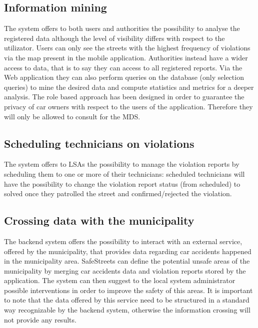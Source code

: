 \subsection{Information mining}
The system offers to both users and authorities the possibility to analyse the registered data although the level of visibility differs with respect to the utilizator. 
Users can only see the streets with the highest frequency of violations via the map present in the mobile application. Authorities instead have a wider access to data, that is to say they can access to all registered reports. Via the Web application they can also perform queries on the database (only selection queries) to mine the desired data and compute statistics and metrics for a deeper analysis. The role based approach has been designed in order to guarantee the privacy of car owners with respect to the users of the application. Therefore they will only be allowed to consult for the MDS.

\subsection{Scheduling technicians on violations}
The system offers to LSAs the possibility to manage the violation reports by scheduling them to one or more of their technicians: scheduled technicians will have the possibility to change the violation report status (from scheduled) to solved once they patrolled the street and confirmed/rejected the violation.

\subsection{Crossing data with the municipality}
The backend system offers the possibility to interact with an external service, offered by the municipality, that provides data regarding car accidents happened in the municipality area. SafeStreets can define the potential unsafe areas of the municipality by merging car accidents data and violation reports stored by the application. The system can then suggest to the local system administrator possible interventions in order to improve the safety of this areas. It is important to note that the data offered by this service need to be structured in a standard way recognizable by the backend system, otherwise the information crossing will not provide any results.
